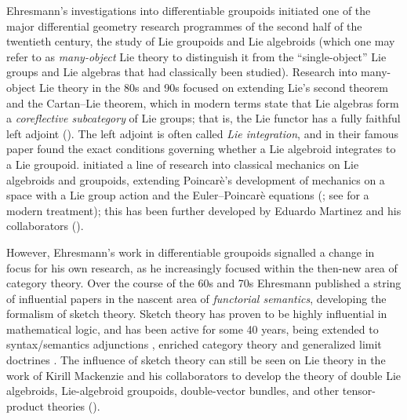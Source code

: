 Ehresmann's investigations into differentiable groupoids initiated one of the major differential geometry research programmes of the second half of the twentieth century, the study of Lie groupoids and Lie algebroids (which one may refer to as \emph{many-object} Lie theory to distinguish it from the ``single-object'' Lie groups and Lie algebras that had classically been studied). Research into many-object Lie theory in the 80s and 90s focused on extending Lie's second theorem and the Cartan--Lie theorem, which in modern terms state that Lie algebras form a \emph{coreflective subcategory} of Lie groups; that is, the Lie functor has a fully faithful left adjoint (\cite{MACKENZIE2000445,moerdijk2002integrability,nistor2000groupoids}). The left adjoint is often called \emph{Lie integration}, and in their famous paper \cite{Crainic2003} found the exact conditions governing whether a Lie algebroid integrates to a Lie groupoid. \cite{Weinstein1996} initiated a line of research into classical mechanics on Lie algebroids and groupoids, extending Poincar\`{e}'s development of mechanics on a space with a Lie group action and the Euler--Poincar\`{e} equations (\cite{poincare1901}; see \cite{marle2013} for a modern treatment);  this has been further developed by Eduardo Martinez and his collaborators (\cite{de2005lagrangian,Martinez2001,Martinez2018,fusca2018}). 

However, Ehresmann's work in differentiable groupoids signalled a change in focus for his own research, as he increasingly focused within the then-new area of category theory. Over the course of the 60s and 70s Ehresmann published a string of influential papers in the nascent area of \emph{functorial semantics}, developing the formalism of sketch theory. 
Sketch theory has proven to be highly influential in mathematical logic, and has been active for some 40 years, being extended to syntax/semantics adjunctions \cite{gabriel2006lokal},  enriched category theory \cite{Kelly1982} and generalized limit doctrines \cite{ADAMEK20027}.
The influence of sketch theory can still be seen on Lie theory in the work of Kirill Mackenzie and his collaborators to develop the theory of double Lie algebroids, Lie-algebroid groupoids, double-vector bundles, and other tensor-product theories (\cite{Mackenzie1992, Mackenzie2011}).

